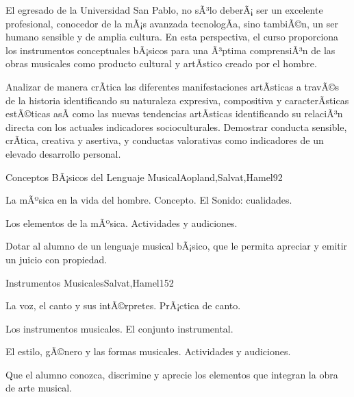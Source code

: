 \begin{syllabus}


\begin{justification}
El egresado de la Universidad San Pablo, no sÃ³lo deberÃ¡ ser un excelente profesional, conocedor de la mÃ¡s avanzada tecnologÃ­a, sino tambiÃ©n, un ser humano sensible y de amplia cultura. En esta perspectiva, el curso proporciona los instrumentos conceptuales bÃ¡sicos para una Ã³ptima comprensiÃ³n de las obras musicales como producto cultural y artÃ­stico creado por el hombre.
\end{justification}

\begin{goals}
\item Analizar de manera crÃ­tica las diferentes manifestaciones artÃ­sticas a travÃ©s de la historia identificando su naturaleza expresiva, compositiva y caracterÃ­sticas estÃ©ticas asÃ­ como las nuevas tendencias artÃ­sticas identificando su relaciÃ³n directa con los actuales indicadores socioculturales. Demostrar conducta sensible, crÃ­tica, creativa y asertiva, y conductas valorativas como indicadores de un elevado desarrollo personal.
\end{goals}

\begin{outcomes}
\end{outcomes}

\begin{unit}{Conceptos BÃ¡sicos del Lenguaje Musical}{Aopland,Salvat,Hamel}{9}{2}
\begin{topics}
	\item La mÃºsica en la vida del hombre. Concepto. El Sonido: cualidades.
	\item Los elementos de la mÃºsica. Actividades y audiciones.
\end{topics}
\begin{unitgoals}
	\item Dotar al alumno de un lenguaje musical bÃ¡sico, que le permita apreciar y emitir un juicio con propiedad.
\end{unitgoals}
\end{unit}

\begin{unit}{Instrumentos Musicales}{Salvat,Hamel}{15}{2}
\begin{topics}
	\item La voz, el canto y sus intÃ©rpretes. PrÃ¡ctica de canto.
	\item Los instrumentos musicales. El conjunto instrumental.
	\item El estilo, gÃ©nero y las formas musicales. Actividades y audiciones.
\end{topics}
\begin{unitgoals}
	\item Que el alumno conozca, discrimine y aprecie los elementos que integran la obra de arte musical.
\end{unitgoals}
\end{unit}


\end{syllabus}
